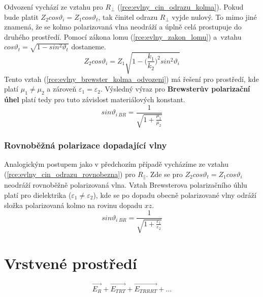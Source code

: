 Odvození vychází ze vztahu pro $R_{\perp}$ (\ref{rce:evlny_cin_odrazu_kolma}). Pokud bude platit $Z_{2}cos\vartheta_{i} = Z_{1}cos\vartheta_{t}$, tak činitel odrazu $R_{\perp}$ vyjde nulový. To mimo jiné znamená, že se kolmo polarizovaná vlna neodráží a úplně celá prostupuje do druhého prostředí. Pomocí zákona lomu (\ref{rce:evlny_zakon_lomu}) a~vztahu $cos\vartheta_{t} = \sqrt{1-sin^{2}\vartheta_{t}}$ dostaneme.
\begin{equation}
	Z_{2}cos\vartheta_{i} = Z_{1}\sqrt{1-\bigg(\frac{k_{1}}{k_{2}}\bigg)^{2}sin^{2}\vartheta_{i}}
	\label{rce:evlny_brewster_kolma_odvozeni}
\end{equation}
Tento vztah (\ref{rce:evlny_brewster_kolma_odvozeni}) má řešení pro prostředí, kde platí $\mu_{1} \ne \mu_{2}$ a zároveň $\varepsilon_{1} = \varepsilon_{2}$. Výsledný výraz pro {\bf Brewsterův polarizační úhel} platí tedy pro tuto závislost materiálových konstant.
\begin{equation}
	sin\vartheta_{i\ BR} = \frac{1}{\sqrt{1+\frac{\mu_{1}}{\mu_{2}}}}
	\label{rce:evlny_brewster_kolma}
\end{equation}

\subsubsection*{Rovnoběžná polarizace dopadající vlny}
Analogickým postupem jako v předchozím případě vycházíme ze vztahu (\ref{rce:evlny_cin_odrazu_rovnobezna}) pro $R_{\parallel}$. Zde se pro $Z_{2}cos\vartheta_{t} = Z_{1}cos\vartheta_{i}$ neodráží rovnoběžně polarizovaná vlna. Vztah Brewsterova polarizačního úhlu platí pro dielektrika ($\varepsilon_{1} \ne \varepsilon_{2}$), kde se po dopadu obecně polarizované vlny odráží složka polarizovaná kolmo na rovinu dopadu $xz$.
\begin{equation}
	sin\vartheta_{i\ BR} = \frac{1}{\sqrt{1+\frac{\varepsilon_{1}}{\varepsilon_{2}}}}
	\label{rce:evlny_brewster_kolma}
\end{equation}
\newpage

\section{Vrstvené prostředí}

\begin{equation}
	\vec{E_{R}} + \vec{E_{TRT}} + \vec{E_{TRRRT}} + \ldots
	\label{rce:evlny_vrstvene_rada}
\end{equation}



